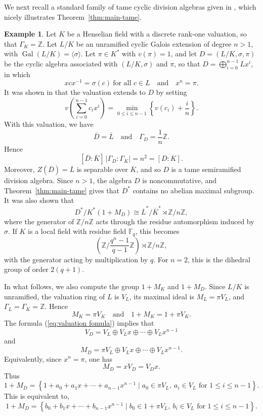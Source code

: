 \documentclass[11pt]{amsart}
\theoremstyle{definition}
\newtheorem{example}[theorem]{Example}
\begin{document}
We next recall a standard family of tame cyclic division algebras given in \cite[Example 8]{HaW1}, which nicely illustrates Theorem~\ref{thm:main-tame}.

\begin{example}
\label{ex:valued-cyclic}
Let $K$ be a Henselian field with a discrete rank-one valuation, 
so that $\Gamma_K=\mathbb Z$.  Let $L/K$ be an unramified cyclic Galois
extension of degree $n>1$, with $\operatorname{Gal}(L/K)=\langle\sigma\rangle$.
Let $\pi\in K^*$ with $v(\pi)=1$, and let $D=(L/K,\sigma,\pi)$ be the cyclic algebra associated with $(L/K,\sigma)$ and $\pi$, so that $D=\bigoplus_{i=0}^{n-1}Lx^i$, in which
\begin{equation}\label{eq:cyclic-multiplication}
    xcx^{-1}=\sigma(c)\ \text{for all }c\in L\quad\text{and}\quad x^n=\pi.
\end{equation}
It was shown in \cite[Example~8]{HaW1} that the
valuation extends to $D$ by setting
\begin{equation}\label{eq:valuation fomula}
     v\left(\sum_{i=0}^{n-1}c_i x^i\right)
        =
        \min_{0\leq i\leq n-1}\left\{v(c_i)+\frac{i}{n}\right\}.
\end{equation}
With this valuation, we have
\[
        \overline D=\overline L
        \quad\text{and}\quad
        \Gamma_D=\frac1n\mathbb Z.
\]
Hence
\[
        [\overline D:\overline K]\,|\Gamma_D:\Gamma_K|
        =
        n^2
        =
        [D:K].
\]
Moreover, $Z(\overline D)=\overline L$ is separable over $\overline K$, and
so $D$ is a tame
semiramified division algebra.  Since $n>1$, the algebra $D$ is
noncommutative, and Theorem~\ref{thm:main-tame} gives that $D^*$ contains no
abelian maximal subgroup. It was also shown that
\[
        D^*/K^*(1+M_D)
        \cong
        \overline L^*/\overline K^*\rtimes \mathbb Z/n\mathbb Z,
\]
where the generator of $\mathbb Z/n\mathbb Z$ acts through the residue
automorphism induced by $\sigma$.  If $K$ is a local field with residue field
$\mathbb F_q$, this becomes
\[
        \left(\mathbb Z/\frac{q^n-1}{q-1}\mathbb Z\right)
        \rtimes \mathbb Z/n\mathbb Z,
\]
with the generator acting by multiplication by $q$.  For $n=2$, this is the
dihedral group of order $2(q+1)$.

In what follows, we also compute the group $1+M_K$ and $1+M_D$.  Since $L/K$ is
unramified, the valuation ring of $L$ is $V_L$, its maximal ideal is
$M_L=\pi V_L$, and $\Gamma_L=\Gamma_K=\mathbb Z$.  Hence
\[
        M_K=\pi V_K
        \quad
        \text{and}
        \quad
        1+M_K=1+\pi V_K.
\]
The formula (\ref{eq:valuation fomula}) implies that
\[
        V_D=V_L\oplus V_Lx\oplus\cdots\oplus V_Lx^{n-1}
\]
and
\[
        M_D=\pi V_L\oplus V_Lx\oplus\cdots\oplus V_Lx^{n-1}.
\]
Equivalently, since $x^n=\pi$, one has
\[
        M_D=xV_D=V_Dx.
\]
Thus
\[
        1+M_D
        =
        \left\{
        1+a_0+a_1x+\cdots+a_{n-1}x^{n-1}
        \mid
        a_0\in \pi V_L,\ a_i\in V_L\text{ for }1\leq i\leq n-1
        \right\}.
\]
This is equivalent to,
\[
        1+M_D
        =
        \left\{
        b_0+b_1x+\cdots+b_{n-1}x^{n-1}
        \mid
        b_0\in 1+\pi V_L,\ b_i\in V_L\text{ for }1\leq i\leq n-1
        \right\}.
\]


\end{example}
\end{document}
